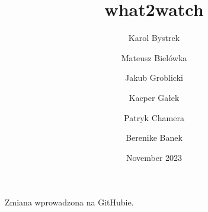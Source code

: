 \documentclass{article}
\title{what2watch}
\author{Karol Bystrek\and Mateusz Bielówka\and Jakub Groblicki\and Kacper Gałek\and Patryk Chamera\and Berenike Banek}
\date{November 2023}
\begin{document}
\maketitle

Zmiana wprowadzona na GitHubie.






\end{document}
